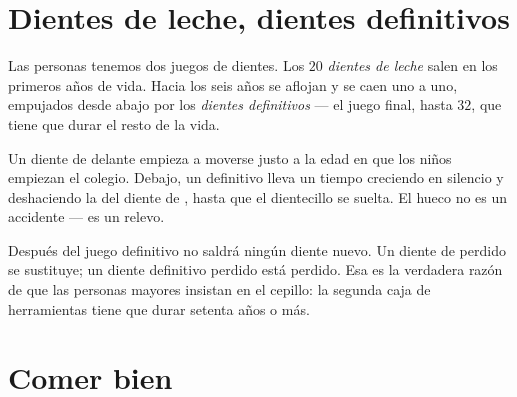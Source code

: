 \section{Dientes de leche, dientes definitivos}

\begin{proposition}\label{prop:g2:teeth-and-eating-well:sets}
Las personas tenemos dos juegos de dientes. Los $20$ \emph{dientes de
leche} salen en los primeros años de vida.
Hacia los seis años se aflojan y se caen uno a uno, empujados desde
abajo por los \emph{dientes definitivos}
--- el juego final, hasta $32$, que tiene que durar el resto de la vida.
\end{proposition}
\admitted

\begin{example}\label{ex:g2:teeth-and-eating-well:wobbly}
Un diente de delante empieza a moverse justo a la edad en que los
niños empiezan el colegio. Debajo, un  definitivo lleva un
tiempo creciendo en silencio y deshaciendo la  del diente de
, hasta que el dientecillo se suelta. El hueco no es un accidente
--- es un relevo.
\end{example}

\begin{remark}\label{rem:g2:teeth-and-eating-well:nothird}
Después del juego definitivo no saldrá ningún diente nuevo. Un diente
de  perdido se sustituye; un diente definitivo perdido está
perdido. Esa es la verdadera razón de que las personas mayores insistan
en el cepillo: la segunda caja de herramientas tiene que durar setenta
años o más.
\end{remark}

\section{Comer bien}

